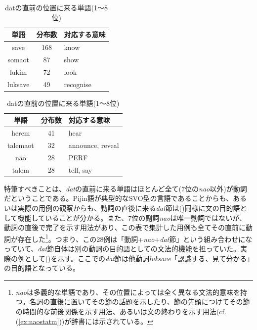 \begin{table}[h]
  \caption{datの直前の位置に来る単語(1～8位)}
  \label{tb:datl1}
  \begin{minipage}{0.5\hsize}
  \begin{center}
    \begin{tabular}{|c||c|l|} \hline
      単語 & 分布数 & 対応する意味 \\ \hline \hline
      save & 168 & know\\ \hline
      somaot & 87 & show\\ \hline
      lukim & 72 & look\\ \hline
      luksave & 49 & recognise\\ \hline
    \end{tabular}
  \end{center}
  \end{minipage}
  \begin{minipage}{0.5\hsize}
    \begin{center}
      \begin{tabular}{|c||c|l|} \hline
        単語 & 分布数 & 対応する意味 \\ \hline \hline
        herem & 41 & hear \\ \hline
        talemaot & 32 & announce, reveal\\ \hline
        nao & 28 & PERF\\ \hline
        talem & 28 & tell, say\\ \hline
      \end{tabular}
    \end{center}
  \end{minipage}
\end{table}

特筆すべきことは、\textit{dat}の直前に来る単語はほとんど全て(7位の\textit{nao}以外)が動詞だということである。Pijin語が典型的なSVO型の言語であることからも、あるいは実際の用例の観察からも、動詞の直後に来る\textit{dat}節は()同様に文の目的語として機能していることが分かる。また、7位の副詞\textit{nao}は唯一動詞ではないが、動詞の直後で完了を示す用法があり、この表で集計した用例も全てその直前に動詞が存在した\footnote{
\textit{nao}は多義的な単語であり、その位置によっては全く異なる文法的意味を持つ。名詞の直後に置いてその節の話題を示したり、節の先頭につけてその節の時間的な前後関係を示す用法、あるいは文の終わりを示す用法(cf.(\ref{ex:naostatm}))が辞書\citep[145]{dictionary}には示されている。}。つまり、この28例は「動詞+\textit{nao}+\textit{dat}節」という組み合わせになっていて、\textit{dat}節自体は別の動詞の目的語としての文法的機能を担っていた。実際の例として()を示す。ここでの\textit{dat}節は他動詞\textit{luksave}「認識する、見て分かる」の目的語となっている。

